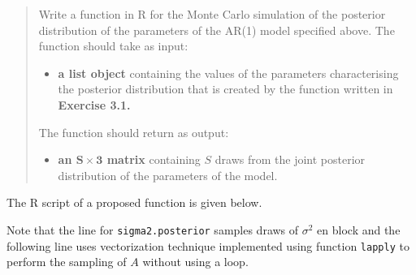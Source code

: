 \documentclass[
  letterpaper,
  DIV=11,
  numbers=noendperiod]{scrreprt}
\newenvironment{Shaded}{\begin{snugshade}}{\end{snugshade}}
\newcommand{\AttributeTok}[1]{\textcolor[rgb]{0.40,0.45,0.13}{#1}}
\newcommand{\ControlFlowTok}[1]{\textcolor[rgb]{0.00,0.23,0.31}{#1}}
\newcommand{\DecValTok}[1]{\textcolor[rgb]{0.68,0.00,0.00}{#1}}
\newcommand{\FunctionTok}[1]{\textcolor[rgb]{0.28,0.35,0.67}{#1}}
\newcommand{\NormalTok}[1]{\textcolor[rgb]{0.00,0.23,0.31}{#1}}
\newcommand{\OtherTok}[1]{\textcolor[rgb]{0.00,0.23,0.31}{#1}}
\newcommand{\SpecialCharTok}[1]{\textcolor[rgb]{0.37,0.37,0.37}{#1}}
\providecommand{\tightlist}{%
  \setlength{\itemsep}{0pt}\setlength{\parskip}{0pt}}\usepackage{longtable,booktabs,array}
\begin{document}
\begin{quote}
Write a function in R for the Monte Carlo simulation of the posterior
distribution of the parameters of the AR(1) model specified above. The
function should take as input:

\begin{itemize}
\tightlist
\item
  \textbf{a list object} containing the values of the parameters
  characterising the posterior distribution that is created by the
  function written in \textbf{Exercise 3.1.}
\end{itemize}

The function should return as output:

\begin{itemize}
\tightlist
\item
  \textbf{an \(\mathbf{S\times 3}\) matrix} containing \(S\) draws from
  the joint posterior distribution of the parameters of the model.
\end{itemize}
\end{quote}

The R script of a proposed function is given below.

Note that the line for \texttt{sigma2.posterior} samples draws of
\(\sigma^2\) en block and the following line uses vectorization
technique implemented using function \texttt{lapply} to perform the
sampling of \(A\) without using a loop.

\begin{Shaded}
\end{Shaded}
\end{document}
